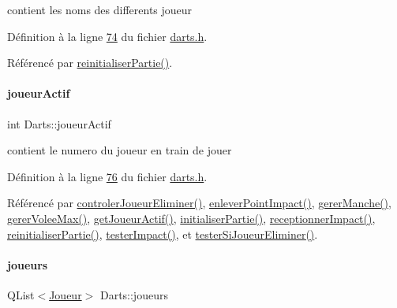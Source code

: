contient les noms des differents joueur 



Définition à la ligne \hyperlink{darts_8h_source_l00074}{74} du fichier \hyperlink{darts_8h_source}{darts.\+h}.



Référencé par \hyperlink{darts_8cpp_source_l00184}{reinitialiser\+Partie()}.

\mbox{\label{class_darts_a68fb01b9aad6502e4429dfbf2a72d50b}} 
\paragraph{\texorpdfstring{joueur\+Actif}{joueurActif}}
{\footnotesize\ttfamily int Darts\+::joueur\+Actif\hspace{0.3cm}{\ttfamily [private]}}



contient le numero du joueur en train de jouer 



Définition à la ligne \hyperlink{darts_8h_source_l00076}{76} du fichier \hyperlink{darts_8h_source}{darts.\+h}.



Référencé par \hyperlink{darts_8cpp_source_l00349}{controler\+Joueur\+Eliminer()}, \hyperlink{darts_8cpp_source_l00274}{enlever\+Point\+Impact()}, \hyperlink{darts_8cpp_source_l00303}{gerer\+Manche()}, \hyperlink{darts_8cpp_source_l00409}{gerer\+Volee\+Max()}, \hyperlink{darts_8cpp_source_l00077}{get\+Joueur\+Actif()}, \hyperlink{darts_8cpp_source_l00144}{initialiser\+Partie()}, \hyperlink{darts_8cpp_source_l00223}{receptionner\+Impact()}, \hyperlink{darts_8cpp_source_l00184}{reinitialiser\+Partie()}, \hyperlink{darts_8cpp_source_l00246}{tester\+Impact()}, et \hyperlink{darts_8cpp_source_l00372}{tester\+Si\+Joueur\+Eliminer()}.

\mbox{\label{class_darts_a81bc116f3ae70cea1f492f87f01901c7}} 
\paragraph{\texorpdfstring{joueurs}{joueurs}}
{\footnotesize\ttfamily Q\+List$<$\hyperlink{class_joueur}{Joueur}$>$ Darts\+::joueurs\hspace{0.3cm}{\ttfamily [private]}}



